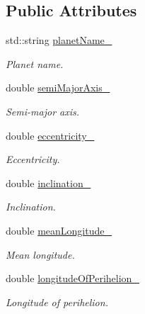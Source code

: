 \subsection*{Public Attributes}
\begin{DoxyCompactItemize}
\item 
std\+::string \hyperlink{structtudat_1_1ephemerides_1_1ApproximatePlanetPositionsDataContainer_a6bd2333695968c346ca1844b54eb5729}{planet\+Name\+\_\+}
\begin{DoxyCompactList}\small\item\em Planet name. \end{DoxyCompactList}\item 
double \hyperlink{structtudat_1_1ephemerides_1_1ApproximatePlanetPositionsDataContainer_ac08c9711d1912974f96721ec8a66f576}{semi\+Major\+Axis\+\_\+}
\begin{DoxyCompactList}\small\item\em Semi-\/major axis. \end{DoxyCompactList}\item 
double \hyperlink{structtudat_1_1ephemerides_1_1ApproximatePlanetPositionsDataContainer_af47f7d417c91a106312eae9e86e7c044}{eccentricity\+\_\+}
\begin{DoxyCompactList}\small\item\em Eccentricity. \end{DoxyCompactList}\item 
double \hyperlink{structtudat_1_1ephemerides_1_1ApproximatePlanetPositionsDataContainer_aab4e267bda985e1e9ce56aabffc94246}{inclination\+\_\+}
\begin{DoxyCompactList}\small\item\em Inclination. \end{DoxyCompactList}\item 
double \hyperlink{structtudat_1_1ephemerides_1_1ApproximatePlanetPositionsDataContainer_a825a60052373aa68c2ffd30cb3c07c50}{mean\+Longitude\+\_\+}
\begin{DoxyCompactList}\small\item\em Mean longitude. \end{DoxyCompactList}\item 
double \hyperlink{structtudat_1_1ephemerides_1_1ApproximatePlanetPositionsDataContainer_adbbfbfbce7f44d3291c6ea71255f4757}{longitude\+Of\+Perihelion\+\_\+}
\begin{DoxyCompactList}\small\item\em Longitude of perihelion. \end{DoxyCompactList}\item 

\end{DoxyCompactItemize}
